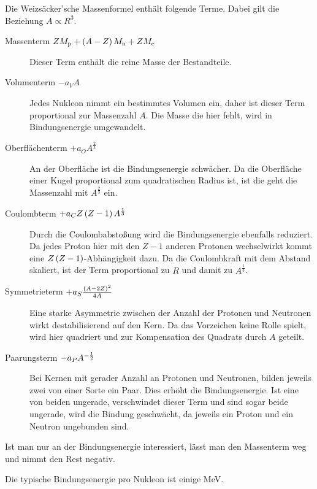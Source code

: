 Die Weizsäcker'sche Massenformel enthält folgende Terme. Dabei gilt die
Beziehung $A \propto R^3$.
\begin{description}
    \item[Massenterm $ZM_\text{p}+\del{A-Z}M_\text{n}+ZM_\text{e}$]
        Dieser Term enthält die reine Masse der Bestandteile.
    \item[Volumenterm $-a_VA$]
        Jedes Nukleon nimmt ein bestimmtes Volumen ein, daher ist dieser Term
        proportional zur Massenzahl $A$. Die Masse die hier fehlt, wird in
        Bindungsenergie umgewandelt.
    \item[Oberflächenterm $+a_OA^{\frac23}$]
        An der Oberfläche ist die Bindungsenergie schwächer. Da die Oberfläche
        einer Kugel proportional zum quadratischen Radius ist, ist die geht die
        Massenzahl mit $A^{\frac23}$ ein.
    \item[Coulombterm $+a_CZ\del{Z-1}A^{\frac13}$]
        Durch die Coulombabstoßung wird die Bindungsenergie ebenfalls
        reduziert. Da jedes Proton hier mit den $Z-1$ anderen Protonen
        wechselwirkt kommt eine $Z\del{Z-1}$-Abhängigkeit dazu. Da die
        Coulombkraft mit dem Abstand skaliert, ist der Term proportional zu $R$
        und damit zu $A^{\frac13}$.
    \item[Symmetrieterm $+a_S\frac{\del{A-2Z}^2}{4A}$]
        Eine starke Asymmetrie zwischen der Anzahl der Protonen und Neutronen
        wirkt destabilisierend auf den Kern. Da das Vorzeichen keine Rolle
        spielt, wird hier quadriert und zur Kompensation des Quadrats durch $A$
        geteilt.
    \item[Paarungsterm $-a_PA^{-\frac 12}$]
        Bei Kernen mit gerader Anzahl an Protonen und Neutronen, bilden jeweils
        zwei von einer Sorte ein Paar. Dies erhöht die Bindungsenergie. Ist
        eine von beiden ungerade, verschwindet dieser Term und sind sogar beide
        ungerade, wird die Bindung geschwächt, da jeweils ein Proton und ein
        Neutron ungebunden sind.
\end{description}
Ist man nur an der Bindungsenergie interessiert, lässt man den Massenterm weg und nimmt den Rest negativ.

Die typische Bindungsenergie pro Nukleon ist einige \si{\mega\electronvolt}.

